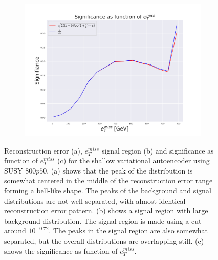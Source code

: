 \begin{figure}[H]
    \hfill  
    \begin{subfigure}{.49\textwidth}
        \includegraphics[width=\textwidth]{Figures/VAE_testing/small/2lep/significance_etmiss_800p0p050_-0.8542149600758421.pdf}
        \caption{}
        \label{ffig:VAE_2lep_small_signi_800}
    \end{subfigure}
    \hfill      
    \caption[2lep shallow network | $800p50$ | VAE]{Reconstruction error (a), $e_T^{miss}$ signal region (b) and significance as function of 
    $e_T^{miss}$ (c) for the shallow variational autoencoder using SUSY $800p50$. 
    (a) shows that the peak of the distribution is somewhat centered in the middle 
    of the reconstruction error range forming a bell-like shape. The peaks of the background and signal 
    distributions are not well separated, with almost identical reconstruction error pattern. (b) 
    shows a signal region with large background distribution. The signal region is made using a cut around
    $10^{-0.72}$. The peaks in the signal region are also somewhat 
    separated, but the overall distributions are overlapping still. 
    (c) shows the significance as function of $e_T^{miss}$.}
    \label{fig:VAE_2lep_small_rec_sig_signi_800}
\end{figure}



